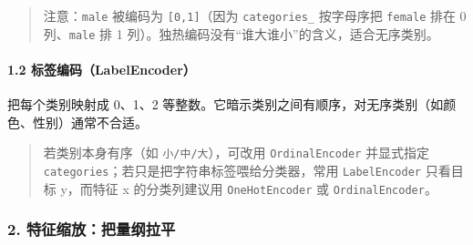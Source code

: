 \begin{quote}
注意：\texttt{male} 被编码为 \texttt{{[}0,1{]}}（因为
\texttt{categories\_} 按字母序把 \texttt{female} 排在 0
列、\texttt{male} 排 1
列）。独热编码没有``谁大谁小''的含义，适合无序类别。
\end{quote}

\paragraph{1.2
标签编码（LabelEncoder）}\label{ux6807ux7b7eux7f16ux7801labelencoder}

把每个类别映射成 0、1、2
等整数。它暗示类别之间有顺序，对无序类别（如颜色、性别）通常不合适。

\begin{Shaded}
\begin{Highlighting}[]

\OperatorTok{=}\NormalTok{ [}\NormalTok{, }\NormalTok{, }\NormalTok{, }\NormalTok{]}
\OperatorTok{=}
\NormalTok{(}
\NormalTok{(}
\end{Highlighting}
\end{Shaded}

\begin{Shaded}
\begin{Highlighting}[]
\end{Highlighting}
\end{Shaded}

\begin{quote}
若类别本身有序（如 \texttt{小/中/大}），可改用 \texttt{OrdinalEncoder}
并显式指定 \texttt{categories}；若只是把字符串标签喂给分类器，常用
\texttt{LabelEncoder} 只看目标 y，而特征 x 的分类列建议用
\texttt{OneHotEncoder} 或 \texttt{OrdinalEncoder}。
\end{quote}

\subsubsection{2.
特征缩放：把量纲拉平}\label{ux7279ux5f81ux7f29ux653eux628aux91cfux7eb2ux62c9ux5e73}

